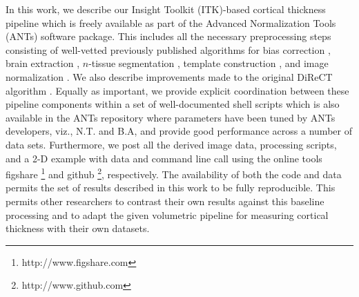 In this work, we describe our Insight Toolkit (ITK)-based cortical thickness pipeline
which is freely available as part of the Advanced Normalization Tools
(ANTs) software package.  This includes all the necessary preprocessing steps consisting
of well-vetted previously published algorithms for bias correction \citep{tustison2010},
brain extraction \citep{avants2010a}, $n$-tissue segmentation \citep{avants2011a},
template construction \citep{avants2010}, and image normalization \citep{avants2011}.
We also describe improvements made to the original DiReCT algorithm \citep{das2009}.
Equally as important, we provide explicit coordination between
these pipeline components within a set of well-documented shell scripts which 
is also available in the ANTs repository where parameters have been tuned
by ANTs developers, viz., N.T. and B.A,
and provide good performance across a number of data sets.
Furthermore, we post all the derived image data, processing scripts, and a 2-D example with data and command line call 
using the online tools figshare%
\footnote{
http://www.figshare.com
}
 and github%
\footnote{
http://www.github.com
}, respectively.
The
availability of both the code and data permits
the set of results described in this work to be fully reproducible.  This
permits other researchers to contrast their own results against
this baseline processing and to adapt the given volumetric pipeline for measuring
cortical thickness with their own datasets.







